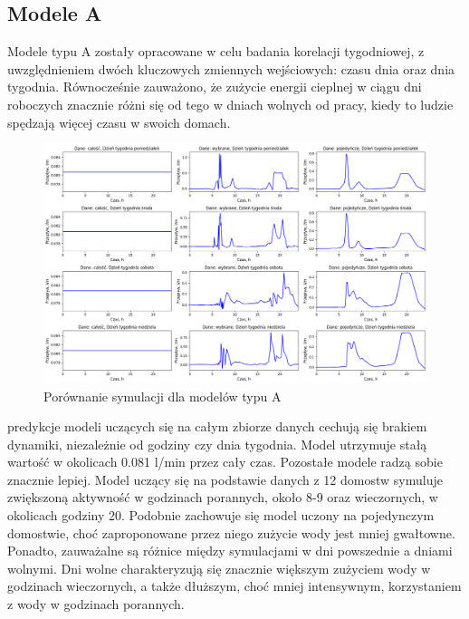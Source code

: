 \documentclass[a4paper,twoside,12pt]{book}
\begin{document}
\subsection*{Modele A}
Modele typu A zostały opracowane w celu badania korelacji tygodniowej, z uwzględnieniem dwóch kluczowych zmiennych wejściowych: czasu dnia oraz dnia tygodnia. Równocześnie zauważono, że zużycie energii cieplnej w ciągu dni roboczych znacznie różni się od tego w dniach wolnych od pracy, kiedy to ludzie spędzają więcej czasu w swoich domach.\\
\begin{figure}[!h]
  \centering
  \includegraphics[width=1\textwidth]{img/Model_A.png}
  \caption{Porównanie symulacji dla modelów typu A}
  \label{fig:etykieta-rysunku}
\end{figure}

predykcje modeli uczących się na całym zbiorze danych cechują się brakiem dynamiki, niezależnie od godziny czy dnia tygodnia. Model utrzymuje stałą wartość w okolicach 0.081 l/min przez cały czas. Pozostałe modele radzą sobie znacznie lepiej. Model uczący się na podstawie danych z 12 domostw symuluje zwiększoną aktywność w godzinach porannych, około 8-9 oraz wieczornych, w okolicach godziny 20. Podobnie zachowuje się model uczony na pojedynczym domostwie, choć zaproponowane przez niego zużycie wody jest mniej gwałtowne. Ponadto, zauważalne są różnice między symulacjami w dni powszednie a dniami wolnymi. Dni wolne charakteryzują się znacznie większym zużyciem wody w godzinach wieczornych, a także dłuższym, choć mniej intensywnym, korzystaniem z wody w godzinach porannych.
\end{document}
